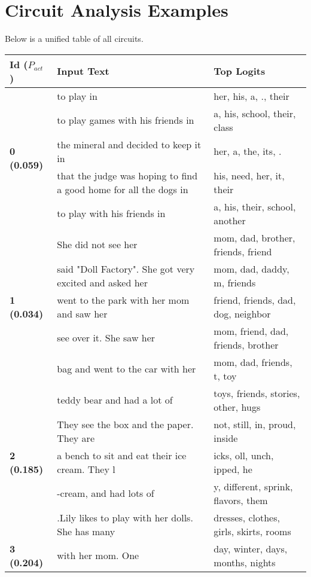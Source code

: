 \documentclass{article}
\begin{document}
\section*{Circuit Analysis Examples}

\noindent Below is a unified table of all circuits.

\begin{adjustbox}{max width=\textwidth}
\small
\begin{tabular}{p{} p{} p{}}
\toprule
\textbf{Id ($P_{act}$)} & \textbf{Input Text} & \textbf{Top Logits} \\
\midrule
\multirow{5}{*}{\textbf{0 (0.059)}} & to play in & her,  his,  a, .,  their \\
 & to play games with his friends in & a,  his,  school,  their,  class \\
 & the mineral and decided to keep it in & her,  a,  the,  its, . \\
 & that the judge was hoping to find a good home for all the dogs in & his,  need,  her,  it,  their \\
 & to play with his friends in & a,  his,  their,  school,  another \\
\midrule
\multirow{5}{*}{\textbf{1 (0.034)}} & She did not see her & mom,  dad,  brother,  friends,  friend \\
 & said "Doll Factory". She got very excited and asked her & mom,  dad,  daddy,  m,  friends \\
 & went to the park with her mom and saw her & friend,  friends,  dad,  dog,  neighbor \\
 & see over it. She saw her & mom,  friend,  dad,  friends,  brother \\
 & bag and went to the car with her & mom,  dad,  friends,  t,  toy \\
\midrule
\multirow{5}{*}{\textbf{2 (0.185)}} & teddy bear and had a lot of & toys,  friends,  stories,  other,  hugs \\
 & They see the box and the paper. They are & not,  still,  in,  proud,  inside \\
 & a bench to sit and eat their ice cream. They l & icks, oll, unch, ipped, he \\
 & -cream, and had lots of & y,  different,  sprink,  flavors,  them \\
 & .Lily likes to play with her dolls. She has many & dresses,  clothes,  girls,  skirts,  rooms \\
\midrule
\multirow{5}{*}{\textbf{3 (0.204)}} & with her mom. One & day,  winter,  days,  months,  nights \\

\end{tabular}
\end{adjustbox}
\end{document}
